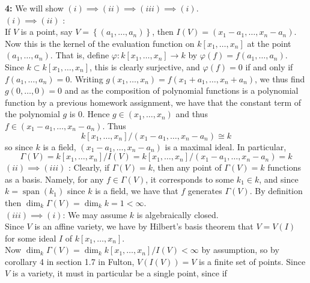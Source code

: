 \documentclass[a4paper]{article}
\DeclareMathOperator{\Span}{span}
\begin{document}
    \textbf{4:} We will show $(i) \implies (ii) \implies (iii) \implies (i)$.\\
    \linebreak
    $(i) \implies (ii)$ :\\
    If $V$ is a point, say $V = \left\{ (a_1, \ldots, a_n) \right\} $, then
    $I(V) = (x_1 - a_1, \ldots, x_n - a_n)$. Now this is the kernel of the
    evaluation function on $k\left[ x_1, \ldots, x_n \right] $ at the point
    $(a_1, \ldots, a_n)$. That is, define
    $\varphi  \colon k\left[ x_1, \ldots, x_n \right] \to k$ by
    $\varphi (f) = f(a_1, \ldots, a_n)$. Since $k \subset  k \left[ x_1,
    \ldots, x_n \right] $, this is clearly surjective, and
    $\varphi (f) = 0$ if and only if $f(a_1, \ldots, a_n) = 0$. Writing
    $g (x_1, \ldots, x_n) = f(x_1 + a_1, \ldots, x_n + a_n)$, we thus find
    $g(0, \ldots, 0) = 0$ and as the composition of polynomial functions is
    a polynomial function by a previous homework assignment, we have that
    the constant term of the polynomial $g$ is $0$. Hence
    $g \in \left( x_1, \ldots, x_n \right) $ and thus
    $f \in \left( x_1 - a_1, \ldots, x_n - a_n \right) $.
    Thus 
    \[
        k\left[ x_1, \ldots, x_n \right] / \left( x_1 - a_1, \ldots, x_n - a_n \right) 
        \cong k
    \]
    so since  $k$ is a field, $(x_1- a_1, \ldots, x_n - a_n)$ is a maximal
    ideal. In particular,
    \[
    \Gamma (V) = k\left[ x_1, \ldots, x_n \right] / I(V)
    = k\left[ x_1, \ldots, x_n \right] / (x_1 - a_1, \ldots, x_n - a_n)
    = k
    \] 
    $(ii) \implies (iii)$ : Clearly, if
    $\Gamma (V) = k$, then any point of 
    $\Gamma(V) = k$ functions as a basis. Namely, for any $f \in \Gamma(V)$, it
    corresponds to some $k_1 \in k$, and since $k = \Span (k_1)$ since $k$ is
    a field, we have that $f$ generates $\Gamma (V)$. By definition then
    $\dim_k \Gamma(V) = \dim_k k = 1 < \infty$.\\
    \linebreak
    $(iii) \implies (i)$: We may assume $k$ is algebraically closed.\\
    Since $V$ is an affine variety, we have by Hilbert's basis theorem that
    $V = V(I)$ for some ideal  $I$ of $k\left[ x_1, \ldots, x_n \right] $.\\
    Now $\dim_k \Gamma (V) = \dim_k k\left[ x_1, \ldots, x_n \right] / I(V)
    < \infty$ by assumption, so by corollary 4 in section 1.7 in Fulton,
    $V\left( I(V) \right) = V$ is a finite set of points. Since $V$ is
    a variety, it must in particular be a single point, since if 
\end{document}
